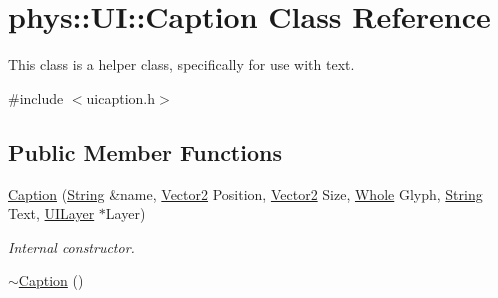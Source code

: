 \hypertarget{classphys_1_1UI_1_1Caption}{
\section{phys::UI::Caption Class Reference}
\label{d4/dfe/classphys_1_1UI_1_1Caption}
}


This class is a helper class, specifically for use with text.  




{\ttfamily \#include $<$uicaption.h$>$}

\subsection*{Public Member Functions}
\begin{DoxyCompactItemize}
\item 
\hyperlink{classphys_1_1UI_1_1Caption_ab2ba9fc3c236e9cd40dc08149d7da211}{Caption} (\hyperlink{namespacephys_aa03900411993de7fbfec4789bc1d392e}{String} \&name, \hyperlink{classphys_1_1Vector2}{Vector2} Position, \hyperlink{classphys_1_1Vector2}{Vector2} Size, \hyperlink{namespacephys_a460f6bc24c8dd347b05e0366ae34f34a}{Whole} Glyph, \hyperlink{namespacephys_aa03900411993de7fbfec4789bc1d392e}{String} Text, \hyperlink{classphys_1_1UILayer}{UILayer} $\ast$Layer)
\begin{DoxyCompactList}\small\item\em Internal constructor. \item\end{DoxyCompactList}\item 
\hypertarget{classphys_1_1UI_1_1Caption_a5443ce0c7c7dc4b4f1c56b124e092a98}{
\hyperlink{classphys_1_1UI_1_1Caption_a5443ce0c7c7dc4b4f1c56b124e092a98}{$\sim$Caption} ()}
\label{d4/dfe/classphys_1_1UI_1_1Caption_a5443ce0c7c7dc4b4f1c56b124e092a98}


\end{DoxyCompactItemize}
